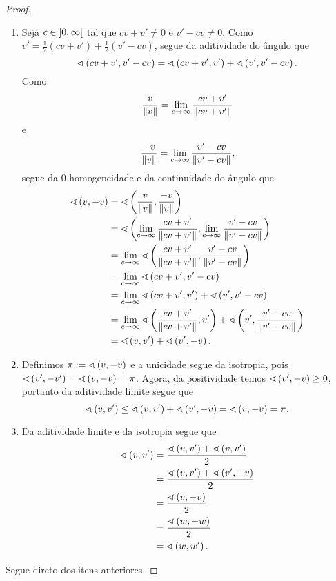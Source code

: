 \begin{proof}
	\begin{enumerate}
	\item Seja $c \in \intaa{0}{\infty}$ tal que $cv+v' \neq 0$ e $v'-cv \neq 0$. Como $v' = \frac{1}{2}(cv+v') + \frac{1}{2}(v'-cv)$, segue da aditividade do ângulo que
		\begin{equation*}
		\ang{cv+v'}{v'-cv} = \ang{cv+v'}{v'} + \ang{v'}{v'-cv}.
		\end{equation*}
	Como
		\begin{equation*}
		\frac{v}{\nor{v}} = \lim_{c \to \infty} \frac{cv+v'}{\nor{cv+v'}}
		\end{equation*}
	e
		\begin{equation*}
		\frac{-v}{\nor{v}} = \lim_{c \to \infty} \frac{v'-cv}{\nor{v'-cv}},
		\end{equation*}
	segue da $0$-homogeneidade e da continuidade do ângulo que
		\begin{align*}
		\ang{v}{-v} &= \ang{\frac{v}{\nor{v}}}{\frac{-v}{\nor{v}}} \\
			&= \ang{\lim_{c \to \infty} \frac{cv+v'}{\nor{cv+v'}}}{\lim_{c \to \infty} \frac{v'-cv}{\nor{v'-cv}}} \\
			&= \lim_{c \to \infty} \ang{\frac{cv+v'}{\nor{cv+v'}}}{\frac{v'-cv}{\nor{v'-cv}}} \\
			&= \lim_{c \to \infty} \ang{cv+v'}{v'-cv} \\
			&= \lim_{c \to \infty} \ang{cv+v'}{v'} + \ang{v'}{v'-cv} \\
			&= \lim_{c \to \infty} \ang{\frac{cv+v'}{\nor{cv+v'}}}{v'} + \ang{v'}{\frac{v'-cv}{\nor{v'-cv}}} \\
			&= \ang{v}{v'} + \ang{v'}{-v}.
		\end{align*}
	
	\item Definimos $\pi := \ang{v}{-v}$ e a unicidade segue da isotropia, pois $\ang{v'}{-v'} = \ang{v}{-v} = \pi$. Agora, da positividade temos $\ang{v'}{-v} \geq 0$, portanto da aditividade limite segue que
		\begin{equation*}
		\ang{v}{v'} \leq \ang{v}{v'} + \ang{v'}{-v} = \ang{v}{-v} = \pi.
		\end{equation*}
	
	\item Da aditividade limite e da isotropia segue que
		\begin{align*}
		\ang{v}{v'} &= \frac{\ang{v}{v'}+\ang{v}{v'}}{2} \\
			&= \frac{\ang{v}{v'}+\ang{v'}{-v}}{2} \\
			&= \frac{\ang{v}{-v}}{2} \\
			&= \frac{\ang{w}{-w}}{2} \\
			&= \ang{w}{w'}.
		\end{align*}
	\end{enumerate}

	\item Segue direto dos itens anteriores.
\end{proof}

